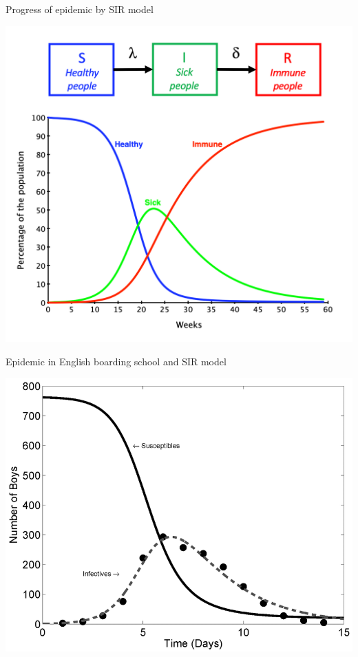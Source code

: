 \begin{frame}{Progress of epidemic by SIR model}
\begin{center}
    \includegraphics[scale = 0.8]{lesson_3/images/sir_model.png}
\end{center}
    
\end{frame}

\begin{frame}{Epidemic in English boarding school and SIR model}
\begin{center}
    \includegraphics[scale = 0.3]{lesson_3/images/english_boarding_school.png}
\end{center}
    
\end{frame}


